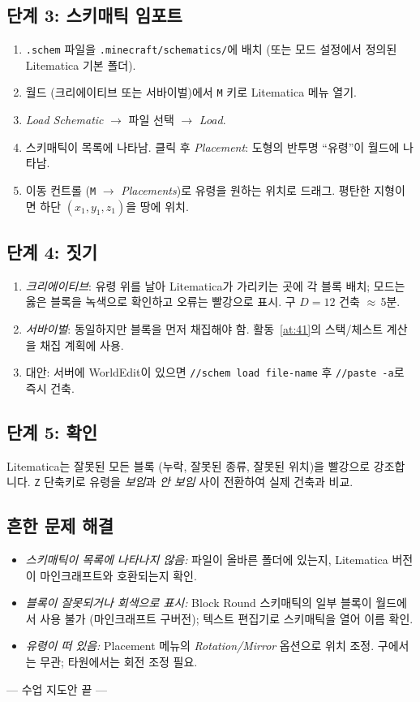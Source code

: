 \documentclass[12pt,a4paper]{scrartcl}
\newcommand{\cmd}[1]{\textcolor{earth}{\texttt{\small #1}}}
\begin{document}
\subsection{단계 3: 스키매틱 임포트}
\begin{enumerate}[leftmargin=1.5em,itemsep=0.15em,topsep=0.3em]
  \item \texttt{.schem} 파일을 \texttt{.minecraft/schematics/}에 배치 (또는 모드 설정에서 정의된 Litematica 기본 폴더).
  \item 월드 (크리에이티브 또는 서바이벌)에서 \texttt{M} 키로 Litematica 메뉴 열기.
  \item \emph{Load Schematic} $\rightarrow$ 파일 선택 $\rightarrow$ \emph{Load}.
  \item 스키매틱이 목록에 나타남. 클릭 후 \emph{Placement}: 도형의 반투명 \enquote{유령}이 월드에 나타남.
  \item 이동 컨트롤 (\texttt{M} $\rightarrow$ \emph{Placements})로 유령을 원하는 위치로 드래그. 평탄한 지형이면 하단 $(x_1, y_1, z_1)$을 땅에 위치.
\end{enumerate}

\subsection{단계 4: 짓기}
\begin{enumerate}[leftmargin=1.5em,itemsep=0.15em,topsep=0.3em]
  \item \emph{크리에이티브}: 유령 위를 날아 Litematica가 가리키는 곳에 각 블록 배치; 모드는 옳은 블록을 녹색으로 확인하고 오류는 빨강으로 표시. 구 $D = 12$ 건축 $\approx$\,5분.
  \item \emph{서바이벌}: 동일하지만 블록을 먼저 채집해야 함. 활동~\ref{at:41}의 스택/체스트 계산을 채집 계획에 사용.
  \item 대안: 서버에 WorldEdit이 있으면 \cmd{//schem load file-name} 후 \cmd{//paste -a}로 즉시 건축.
\end{enumerate}

\subsection{단계 5: 확인}
Litematica는 잘못된 모든 블록 (누락, 잘못된 종류, 잘못된 위치)을 빨강으로 강조합니다. \texttt{Z} 단축키로 유령을 \emph{보임}과 \emph{안 보임} 사이 전환하여 실제 건축과 비교.

\subsection{흔한 문제 해결}
\begin{itemize}[leftmargin=1.3em,itemsep=0.15em,topsep=0.3em,nosep]
  \item \emph{스키매틱이 목록에 나타나지 않음:} 파일이 올바른 폴더에 있는지, Litematica 버전이 마인크래프트와 호환되는지 확인.
  \item \emph{블록이 잘못되거나 회색으로 표시:} Block Round 스키매틱의 일부 블록이 월드에서 사용 불가 (마인크래프트 구버전); 텍스트 편집기로 스키매틱을 열어 이름 확인.
  \item \emph{유령이 떠 있음:} Placement 메뉴의 \emph{Rotation/Mirror} 옵션으로 위치 조정. 구에서는 무관; 타원에서는 회전 조정 필요.
\end{itemize}

\vspace{2em}
\begin{center}
\color{muted}\small\sffamily
--- 수업 지도안 끝 ---
\end{center}
\end{document}
